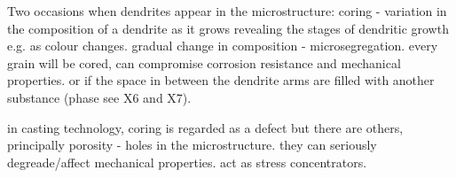 \documentclass[class=report, crop=false, 12pt,a4paper]{standalone}
\begin{document}
Two occasions when dendrites appear in the microstructure: coring - variation in the composition of a dendrite as it grows revealing the stages of dendritic growth e.g. as colour changes. gradual change in composition - microsegregation. every grain will be cored, can compromise corrosion resistance and mechanical properties. or if the space in between the dendrite arms are filled with another substance (phase see X6 and X7). 

in casting technology, coring is regarded as a defect but there are others, principally porosity - holes in the microstructure. they can seriously degreade/affect mechanical properties. act as stress concentrators. 
\end{document}
